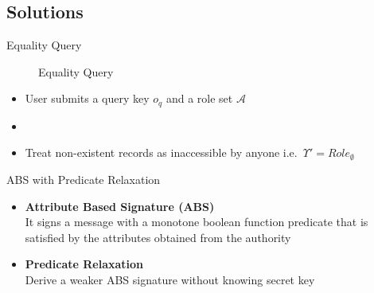 \documentclass[xcolor={dvipsnames},aspectratio=169,10pt]{beamer}
\begin{document}
\subsection{Solutions}

\begin{frame}{Equality Query}
  \begin{figure}
    \resizebox{.9\linewidth}{!}{}
    \caption{Equality Query}
  \end{figure}
  \begin{itemize}
    \item<1-> User submits a query key $o_q$ and a role set $\mathcal{A}$
    \item<4-> 
    \item<5-> Treat non-existent records as \alert{inaccessible by anyone} i.e.\ $\Upsilon' = {Role}_{\emptyset}$
  \end{itemize}
\end{frame}

\begin{frame}{ABS with Predicate Relaxation}
  \begin{itemize}
    \item<+-> \textbf{Attribute Based Signature (ABS)} \\
      \small{It signs a message with a monotone boolean function predicate that is satisfied by the attributes obtained from the authority}
      \begin{figure}
        \resizebox{.85\linewidth}{!}{}
      \end{figure}
    \item<+-> \textbf{Predicate Relaxation} \\
      \small{Derive a \alert{weaker} ABS signature without knowing secret key}
      \begin{figure}
        \resizebox{.85\linewidth}{!}{}
      \end{figure}
  \end{itemize}
\end{frame}
\end{document}
